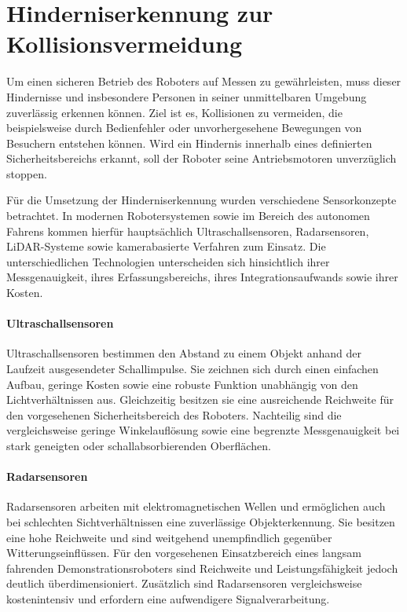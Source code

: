 \section{Hinderniserkennung zur Kollisionsvermeidung}

Um einen sicheren Betrieb des Roboters auf Messen zu gewährleisten, muss dieser Hindernisse und insbesondere Personen in seiner unmittelbaren Umgebung zuverlässig erkennen können. Ziel ist es, Kollisionen zu vermeiden, die beispielsweise durch Bedienfehler oder unvorhergesehene Bewegungen von Besuchern entstehen können. Wird ein Hindernis innerhalb eines definierten Sicherheitsbereichs erkannt, soll der Roboter seine Antriebsmotoren unverzüglich stoppen.

Für die Umsetzung der Hinderniserkennung wurden verschiedene Sensorkonzepte betrachtet. In modernen Robotersystemen sowie im Bereich des autonomen Fahrens kommen hierfür hauptsächlich Ultraschallsensoren, Radarsensoren, LiDAR-Systeme sowie kamerabasierte Verfahren zum Einsatz. Die unterschiedlichen Technologien unterscheiden sich hinsichtlich ihrer Messgenauigkeit, ihres Erfassungsbereichs, ihres Integrationsaufwands sowie ihrer Kosten.

\paragraph{Ultraschallsensoren}

Ultraschallsensoren bestimmen den Abstand zu einem Objekt anhand der Laufzeit ausgesendeter Schallimpulse. Sie zeichnen sich durch einen einfachen Aufbau, geringe Kosten sowie eine robuste Funktion unabhängig von den Lichtverhältnissen aus. Gleichzeitig besitzen sie eine ausreichende Reichweite für den vorgesehenen Sicherheitsbereich des Roboters. Nachteilig sind die vergleichsweise geringe Winkelauflösung sowie eine begrenzte Messgenauigkeit bei stark geneigten oder schallabsorbierenden Oberflächen.

\paragraph{Radarsensoren}

Radarsensoren arbeiten mit elektromagnetischen Wellen und ermöglichen auch bei schlechten Sichtverhältnissen eine zuverlässige Objekterkennung. Sie besitzen eine hohe Reichweite und sind weitgehend unempfindlich gegenüber Witterungseinflüssen. Für den vorgesehenen Einsatzbereich eines langsam fahrenden Demonstrationsroboters sind Reichweite und Leistungsfähigkeit jedoch deutlich überdimensioniert. Zusätzlich sind Radarsensoren vergleichsweise kostenintensiv und erfordern eine aufwendigere Signalverarbeitung. \cite{fraden2016sensors}

